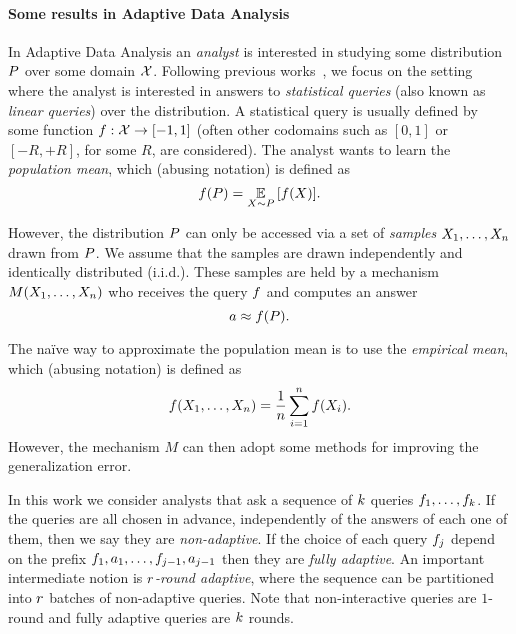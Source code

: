 


\paragraph{Some results in Adaptive Data Analysis}
In Adaptive Data Analysis an \emph{analyst} is interested in studying some distribution $P$ over some domain $\mathcal{X}$.  Following previous works~\cite{DworkFHPRR15,HardtU14,BassilyNSSSU16}, we focus on the setting where the analyst is interested in answers to \emph{statistical queries} (also known as \emph{linear queries}) over the distribution.  A statistical query is usually defined by some function $f : \mathcal{X} \to [-1,1]$ (often other codomains such as $[0,1]$ or $[-R,+R]$, for some $R$, are considered).  The analyst wants to learn the \emph{population mean}, which (abusing notation) is defined as $$\query(\dist) = \ex{\sample \sim \dist}{\query(\sample)}.$$

However, the distribution $P$ can only be accessed via a set of \emph{samples} $X_1,\dots,X_n$ drawn from $P$. We assume that the samples are drawn independently and identically distributed (i.i.d.).  These samples are held by a mechanism $M(X_1,\dots,X_n)$ who receives the query $f$ and computes an answer 
$$a \approx f(P).$$

The na\"ive way to approximate the population mean is to use the \emph{empirical mean}, which (abusing notation) is defined as $$f(X_1,\dots,X_n) = \frac{1}{n} \sum_{i=1}^{n} f(X_i).$$
However, the mechanism $M$ can then adopt some methods for improving the generalization error.

In this work we consider analysts that ask a sequence of $k$ queries $f_1,\dots,f_k$.  If the queries are all chosen in advance, independently of the answers of each one of them, then we say they are \emph{non-adaptive}.  If the choice of each query $f_j$ depend on the prefix $f_1,a_1,\dots,f_{j-1},a_{j-1}$ then they are \emph{fully adaptive}.  An important intermediate notion is \emph{$r$-round adaptive}, where the sequence can be partitioned into $r$ batches of non-adaptive queries.  Note that non-interactive queries are $1$-round and fully adaptive queries are $k$ rounds.

